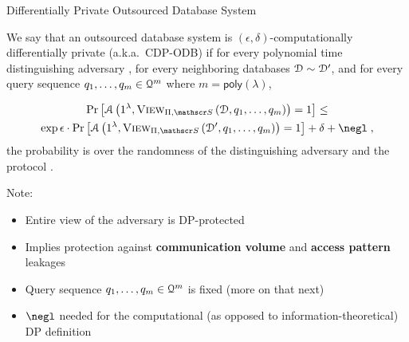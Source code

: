 	\begin{frame}{Differentially Private Outsourced Database System}

		\begin{definition}
			\justify%

			We say that an outsourced database system \protocol{} is $(\epsilon, \delta)$-computationally differentially private (a.k.a.~CDP-ODB) if for every polynomial time distinguishing adversary \adversary{}, for every neighboring databases $\mathcal{D} \sim \mathcal{D}^\prime$, and for every query sequence $\fromNtoM{\query}{1}{m} \in \querySet^m$ where $m = \mathsf{poly}(\lambda)$,

			\begin{multline*}
				\probability{\adversary \left( 1^\lambda, \view{\protocol, \server}{\database, \fromNtoM{\query}{1}{m}} \right) = 1 } \leq \\
				\exp{\epsilon} \cdot \probability{\adversary \left( 1^\lambda, \view{\protocol ,\server}{\database^\prime, \fromNtoM{\query}{1}{m}} \right) = 1} + \delta + \negl \; ,
			\end{multline*}
			the probability is over the randomness of the distinguishing adversary \adversary{} and the protocol \protocol{}.
		\end{definition}

		\pause%

		Note:
		\begin{itemize}
			\item Entire view of the adversary is DP-protected
			\item Implies protection against \textbf{communication volume} and \textbf{access pattern} leakages
			\item Query sequence $\fromNtoM{\query}{1}{m} \in \querySet^m$ is fixed (more on that next)
			\item $\negl$ needed for the computational (as opposed to information-theoretical) DP definition
		\end{itemize}

	\end{frame}

